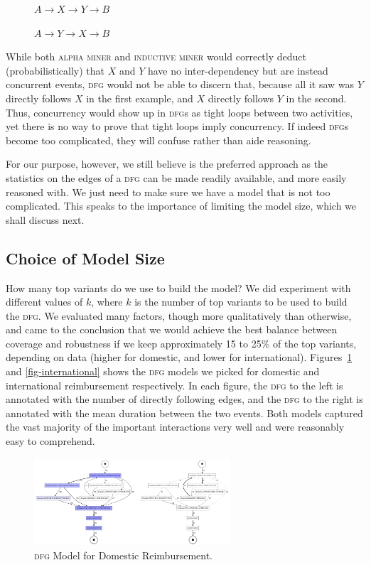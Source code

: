\documentclass[conference]{IEEEtran}
\begin{document}
\vspace{0.5em}
$\phantom{xxxxx}A \rightarrow X \rightarrow Y \rightarrow B$

$\phantom{xxxxx}A \rightarrow Y \rightarrow X \rightarrow B$
\vspace{0.5em}


While both \textsc{alpha miner} and \textsc{inductive miner} would correctly deduct
(probabilistically) that $X$ and $Y$ have no inter-dependency but are
instead concurrent events, \textsc{dfg} would not be able to discern that, because
all it saw was $Y$ directly follows $X$ in the first example, and
$X$ directly follows $Y$ in the second. Thus, concurrency would
show up in \textsc{dfg}s as tight loops between two activities, yet there is no
way to prove that tight loops imply concurrency. If indeed \textsc{dfg}s
become too complicated, they will confuse rather than aide reasoning.

For our purpose, however, we still believe 
is the preferred approach as the statistics on the edges of a \textsc{dfg} can be
made readily available, and more easily reasoned with. We just need to make
sure we have a model that is not too complicated.
This speaks to the importance of limiting the model size, which we shall
discuss next.

\subsection{Choice of Model Size}

How many top variants do we use to build the model?
We did experiment with different values of $k$, where $k$ is the number of
top variants to be used to build the \textsc{dfg}. We
evaluated many factors, though more qualitatively than otherwise,
and came to the conclusion
that we would achieve the best balance between coverage and robustness if
we keep approximately 15 to 25\% of the top variants, depending on data
(higher for domestic, and lower for international). Figures~\ref{fig-domestic}
and \ref{fig-international} shows the \textsc{dfg} models we picked for
domestic and international reimbursement respectively. In each figure,
the \textsc{dfg} to the left is annotated with the number of directly following
edges, and the \textsc{dfg} to the right is annotated with the mean duration between
the two events. Both models captured the vast majority of the important
interactions very well and were reasonably easy to comprehend.

\begin{figure}[htbp]
\centerline{\includegraphics[width=0.65\textwidth]{images/domestic.png}}
\caption{\textsc{dfg} Model for Domestic Reimbursement.}
\label{fig-domestic}
\end{figure}
\end{document}
